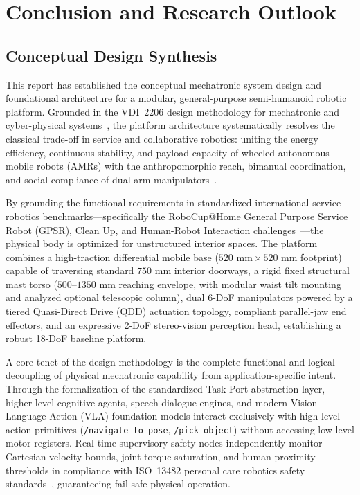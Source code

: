 \section{Conclusion and Research Outlook}
\label{sec:conclusion}

\subsection{Conceptual Design Synthesis}
This report has established the conceptual mechatronic system design and foundational architecture for a modular, general-purpose semi-humanoid robotic platform. Grounded in the VDI~2206 design methodology for mechatronic and cyber-physical systems~\cite{vdi2206}, the platform architecture systematically resolves the classical trade-off in service and collaborative robotics: uniting the energy efficiency, continuous stability, and payload capacity of wheeled autonomous mobile robots (AMRs) with the anthropomorphic reach, bimanual coordination, and social compliance of dual-arm manipulators~\cite{tiagopro,stretch}.

By grounding the functional requirements in standardized international service robotics benchmarks---specifically the RoboCup@Home General Purpose Service Robot (GPSR), Clean Up, and Human-Robot Interaction challenges~\cite{robocupathome}---the physical body is optimized for unstructured interior spaces. The platform combines a high-traction differential mobile base ($520\text{ mm} \times 520\text{ mm}$ footprint) capable of traversing standard $750\text{ mm}$ interior doorways, a rigid fixed structural mast torso ($500\text{--}1350\text{ mm}$ reaching envelope, with modular waist tilt mounting and analyzed optional telescopic column), dual 6-DoF manipulators powered by a tiered Quasi-Direct Drive (QDD) actuation topology, compliant parallel-jaw end effectors, and an expressive 2-DoF stereo-vision perception head, establishing a robust 18-DoF baseline platform.

A core tenet of the design methodology is the complete functional and logical decoupling of physical mechatronic capability from application-specific intent. Through the formalization of the standardized Task Port abstraction layer, higher-level cognitive agents, speech dialogue engines, and modern Vision-Language-Action (VLA) foundation models interact exclusively with high-level action primitives (\texttt{/navigate\_to\_pose}, \texttt{/pick\_object}) without accessing low-level motor registers. Real-time supervisory safety nodes independently monitor Cartesian velocity bounds, joint torque saturation, and human proximity thresholds in compliance with ISO~13482 personal care robotics safety standards~\cite{iso13482}, guaranteeing fail-safe physical operation.

